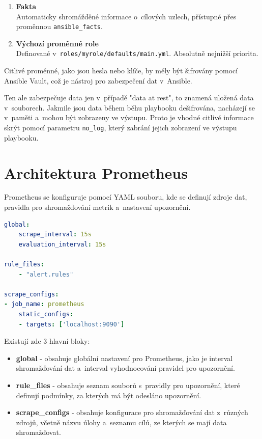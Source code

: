 \begin{itemize}
\begin{enumerate}
        \item \textbf{Fakta}\\
        Automaticky shromážděné informace o~cílových uzlech, přístupné přes proměnnou \texttt{ansible\_facts}.
        
        \item \textbf{Výchozí proměnné role} \\
        Definované v~\texttt{roles/myrole/defaults/main.yml}. Absolutně nejnižší priorita.
    \end{enumerate}
    
    Citlivé proměnné, jako jsou hesla nebo klíče, by měly být šifrovány pomocí Ansible Vault, což je nástroj pro zabezpečení dat v~Ansible. 
    
    Ten ale zabezpečuje data jen v~případě "data at rest", to znamená uložená data v~souborech. 
    Jakmile jsou data během běhu playbooku dešifrována, nacházejí se v~paměti a~mohou být zobrazeny ve výstupu. 
    Proto je vhodné citlivé informace skrýt pomocí parametru \texttt{no\_log}, který zabrání jejich zobrazení ve výstupu playbooku.  \cite{ansibledocs}
\end{itemize}

\chapter{Architektura Prometheus}\label{sec:prometheus}
Prometheus se konfiguruje pomocí YAML souboru, kde se definují zdroje dat, pravidla pro shromažďování metrik a~nastavení upozornění.
\begin{lstlisting}[language=YAML, caption={Prometheus - ukázka konfigurace}, label={lst:prometheusconfig}, captionpos=b]
global:
    scrape_interval: 15s
    evaluation_interval: 15s

rule_files:
    - "alert.rules"

scrape_configs:
- job_name: prometheus
    static_configs:
    - targets: ['localhost:9090']
\end{lstlisting}

Existují zde 3 hlavní bloky:
\begin{itemize}
    \item \textbf{global} - obsahuje globální nastavení pro Prometheus, jako je interval shromažďování dat a~interval vyhodnocování pravidel pro upozornění.
    \item \textbf{rule\_files} - obsahuje seznam souborů s~pravidly pro upozornění, které definují podmínky, za kterých má být odesláno upozornění.
    \item \textbf{scrape\_configs} - obsahuje konfigurace pro shromažďování dat z~různých zdrojů, včetně názvu úlohy a~seznamu cílů, ze kterých se mají data shromažďovat.
\end{itemize}

